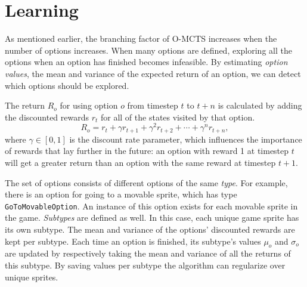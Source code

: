 \section{Learning}
\label{sec:learning}
As mentioned earlier, the branching factor of O-MCTS increases when the number
of options increases. When many options are defined, exploring all the options
when an option has finished becomes infeasible. By estimating
\emph{option values}, the mean and variance of the expected return of an option,
we can detect which options should be explored.

The return $R_o$ for using option $o$ from timestep $t$ to $t+n$ is calculated
by adding the discounted rewards $r_t$ for all of the states visited by that
option.  $$R_o = r_{t} + \gamma r_{t+1} + \gamma^2 r_{t+2} + \cdots + \gamma^n
r_{t+n},$$ where $\gamma \in [0, 1]$ is the discount rate parameter, which
influences the importance of rewards that lay further in the future: an option
with reward 1 at timestep $t$ will get a greater return than an option with the
same reward at timestep $t+1$.  

The set of options consists of different options of the same \emph{type}. For example,
there is an option for going to a movable sprite, which has type
\texttt{GoToMovableOption}. An instance of this option exists for each movable
sprite in the game. \emph{Subtypes} are defined as well. In this case, each
unique game sprite has its own subtype. The mean and variance of the options'
discounted rewards are kept per subtype. Each time an option is finished, its
subtype's values $\mu_o$ and $\sigma_o$ are updated by respectively taking the
mean and variance of all the returns of this subtype. By saving values per
subtype the algorithm can regularize over unique sprites.

